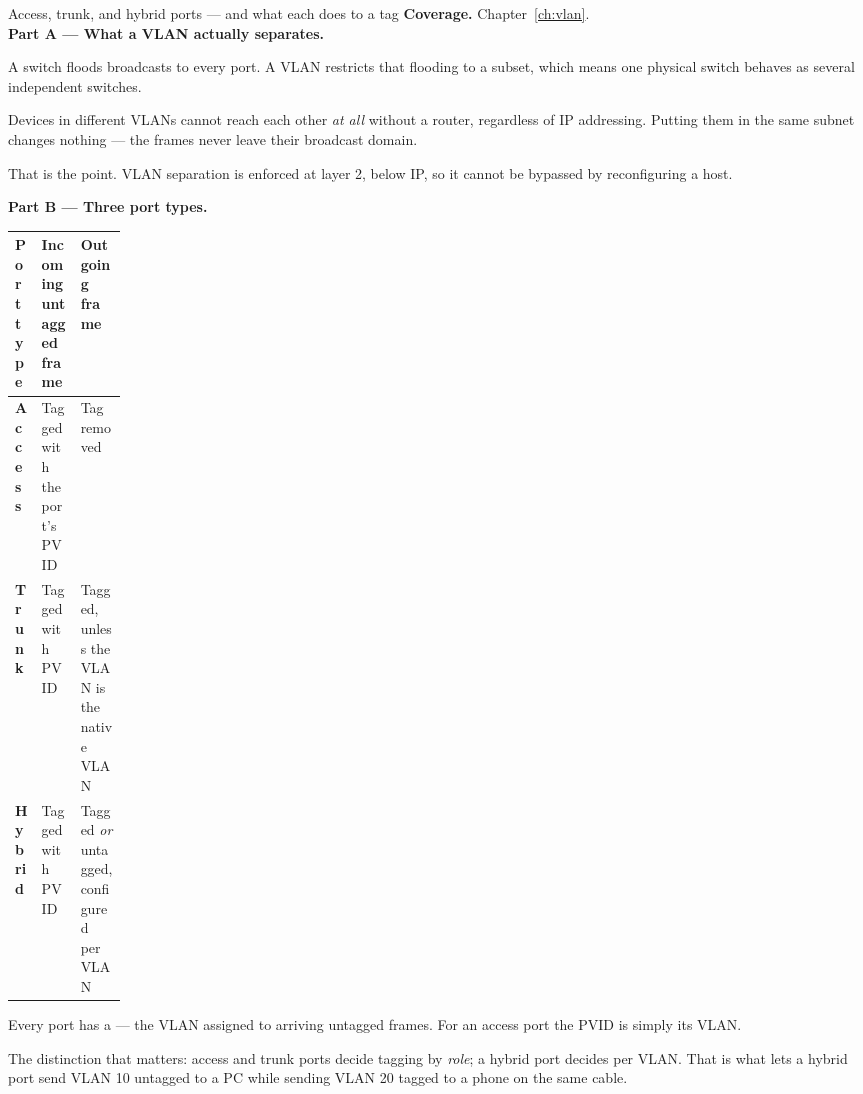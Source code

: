 
\begin{labproject}{Access, trunk, and hybrid ports --- and what each does to a tag}
\textbf{Coverage.} Chapter~\ref{ch:vlan}.\\
\medskip\noindent\textbf{Part A --- What a VLAN actually separates.}\par
A switch floods broadcasts to every port. A VLAN restricts that flooding to a subset, which means one physical switch behaves as several independent switches.

\begin{keyidea}
Devices in different VLANs cannot reach each other \emph{at all} without a router, regardless of IP addressing. Putting them in the same subnet changes nothing --- the frames never leave their broadcast domain.

That is the point. VLAN separation is enforced at layer 2, below IP, so it cannot be bypassed by reconfiguring a host.
\end{keyidea}

\medskip\noindent\textbf{Part B --- Three port types.}\par

\begin{mltable}
\begin{tabularx}{\linewidth}{@{}>{\bfseries}p{0.13\linewidth}X X@{}}
\toprule
\rowcolor{MLPaleBlue!92}
Port type & Incoming untagged frame & Outgoing frame \\
\midrule
Access & Tagged with the port's PVID & Tag removed \\
Trunk & Tagged with PVID & Tagged, unless the VLAN is the native VLAN \\
Hybrid & Tagged with PVID & Tagged \emph{or} untagged, configured per VLAN \\
\bottomrule
\end{tabularx}
\end{mltable}

\begin{keyidea}
Every port has a  --- the VLAN assigned to arriving untagged frames. For an access port the PVID is simply its VLAN.

The distinction that matters: access and trunk ports decide tagging by \emph{role}; a hybrid port decides per VLAN. That is what lets a hybrid port send VLAN 10 untagged to a PC while sending VLAN 20 tagged to a phone on the same cable.
\end{keyidea}


\end{labproject}
